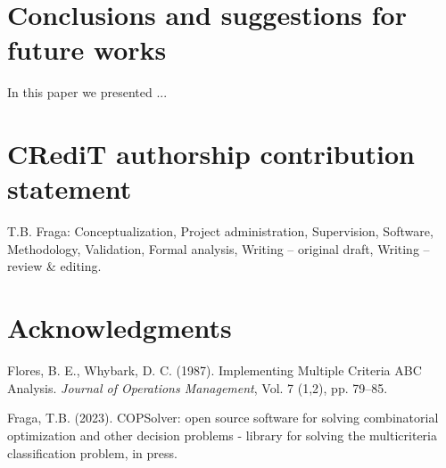 \documentclass[authoryear,manuscript,12pt]{elsarticle}
\begin{document}
\section{Conclusions and suggestions for future works}
\label{sec:conclusions}

In this paper we presented ...

\section{CRediT authorship contribution statement} 
\label{sec:contributions}

T.B. Fraga: Conceptualization, Project administration, Supervision, Software, Methodology, Validation, Formal analysis, Writing – original draft, Writing – review \& editing. 

\section{Acknowledgments}
\label{sec:acknowledgments}





\begin{thebibliography}{1}


Flores, B. E., Whybark, D. C. (1987). Implementing Multiple Criteria ABC Analysis. {\it Journal of Operations Management}, Vol. 7 (1,2), pp. 79--85.

Fraga, T.B. (2023). COPSolver: open source software for solving combinatorial optimization and other decision problems - library for solving the multicriteria classification problem, in press.

\end{thebibliography}
\end{document}
